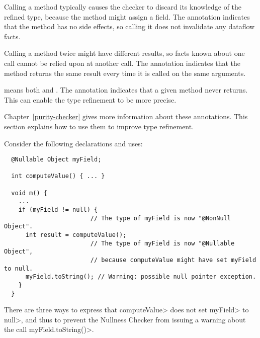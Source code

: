Calling a method typically causes the checker to discard its knowledge of
the refined type, because the method might assign a field.
The  annotation indicates that
the method has no side effects, so calling it does not invalidate any
dataflow facts.

Calling a method twice might have different results, so facts known about
one call cannot be relied upon at another call.
The  annotation indicates that
the method returns the same result every time it is called on the same
arguments.

 means both
 and
.
The  annotation
indicates that a given method never returns.  This can enable the
type refinement to be more precise.

Chapter~\ref{purity-checker} gives more information about these annotations.
This section explains how to use them to improve type refinement.



Consider the following declarations and uses:

\begin{Verbatim}
  @Nullable Object myField;

  int computeValue() { ... }

  void m() {
    ...
    if (myField != null) {
                        // The type of myField is now "@NonNull Object".
      int result = computeValue();
                        // The type of myField is now "@Nullable Object",
                        // because computeValue might have set myField to null.
      myField.toString(); // Warning: possible null pointer exception.
    }
  }
\end{Verbatim}

There are three ways to express that \<computeValue> does not set
\<myField> to \<null>, and thus to prevent the Nullness Checker from
issuing a warning about the call \<myField.toString()>.

